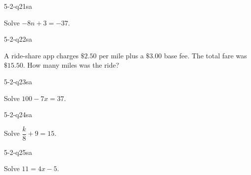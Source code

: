 \begin{practiceQuestion}{5-2-q21}{sa}
\begin{questionText}
Solve $-8n + 3 = -37$.
\end{questionText}
\end{practiceQuestion}

\begin{practiceQuestion}{5-2-q22}{sa}
\begin{questionText}
A ride-share app charges $\$2.50$ per mile plus a $\$3.00$ base fee. The total fare was $\$15.50$. How many miles was the ride?
\end{questionText}
\end{practiceQuestion}

\begin{practiceQuestion}{5-2-q23}{sa}
\begin{questionText}
Solve $100 - 7x = 37$.
\end{questionText}
\end{practiceQuestion}

\begin{practiceQuestion}{5-2-q24}{sa}
\begin{questionText}
Solve $\dfrac{k}{8} + 9 = 15$.
\end{questionText}
\end{practiceQuestion}

\begin{practiceQuestion}{5-2-q25}{sa}
\begin{questionText}
Solve $11 = 4x - 5$.
\end{questionText}
\end{practiceQuestion}


